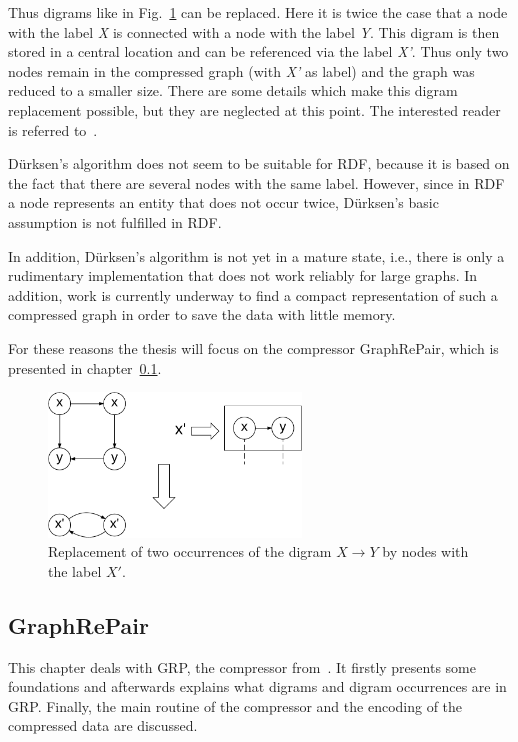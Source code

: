 Thus digrams like in Fig.~\ref{fig:basicdigram} can be replaced. Here it is twice the case that a node with the label \textit{X} is connected with a node with the label \textit{Y}. This digram is then stored in a central location and can be referenced via the label \textit{X'}. Thus only two nodes remain in the compressed graph (with \textit{X'} as label) and the graph was reduced to a smaller size. There are some details which make  this digram replacement possible, but they are neglected at this point. The interested reader is referred to~\cite{mattdk}.

Dürksen's algorithm does not seem to be suitable for RDF, because it is based on the fact that there are several nodes with the same label. However, since in RDF a node represents an entity that does not occur twice, Dürksen's basic assumption is not fulfilled in RDF.

In addition, Dürksen's algorithm is not yet in a mature state, i.e., there is only a rudimentary implementation that does not work reliably for large graphs. In addition, work is currently underway to find a compact representation of such a compressed graph in order to save the data with little memory.~\cite{mattdk}

For these reasons the thesis will focus on the compressor GraphRePair, which is presented in chapter~\ref{ch:GRP}.

\begin{figure}[h]
	\centering
	\includegraphics[width=0.6\textwidth]{figures/relatedwork/basisdigram}
	\caption{Replacement of two occurrences of the digram $X \to Y$ by nodes with the label $X'$.}
	\label{fig:basicdigram}
\end{figure}

\subsection{GraphRePair}\label{ch:GRP}

This chapter deals with GRP, the compressor from~\cite{maneth}. It firstly presents some foundations and afterwards explains what digrams and digram occurrences are in GRP. Finally, the main routine of the compressor and the encoding of the compressed data are discussed.

